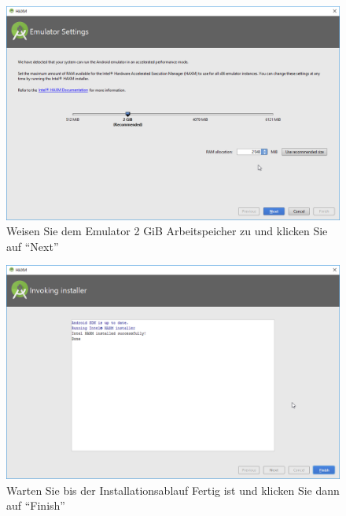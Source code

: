 \documentclass[a4paper,10pt,xetex]{article}
\begin{document}
\begin{figure}
  \centering
  \includegraphics[width=\textwidth]{Installation/3-4}
  \caption{Weisen Sie dem Emulator 2 GiB Arbeitspeicher zu und klicken Sie auf ``Next''}
\end{figure}

\begin{figure}
  \centering
  \includegraphics[width=\textwidth]{Installation/3-5}
  \caption{Warten Sie bis der Installationsablauf Fertig ist und klicken Sie dann auf ``Finish''}
\end{figure}
\end{document}
